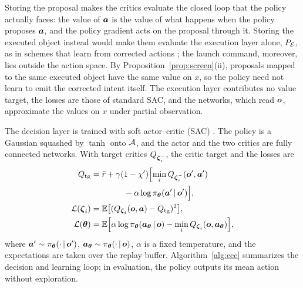 Storing the proposal makes the critics evaluate the closed loop that the policy actually faces: the value of $\boldsymbol{a}$ is the value of what happens when the policy proposes $\boldsymbol{a}$, and the policy gradient acts on the proposal through it. Storing the executed object instead would make them evaluate the execution layer alone, $P_{\mathcal{E}}$, as in schemes that learn from corrected actions \cite{lu2025eaai}; the launch command, moreover, lies outside the action space. By Proposition~\ref{prop:screen}(ii), proposals mapped to the same executed object have the same value on $x$, so the policy need not learn to emit the corrected intent itself. The execution layer contributes no value target, the losses are those of standard SAC, and the networks, which read $\boldsymbol{o}$, approximate the values on $x$ under partial observation.

The decision layer is trained with soft actor--critic (SAC) \cite{haarnoja2018sac}. The policy is a Gaussian squashed by $\tanh$ onto $\mathcal{A}$, and the actor and the two critics are fully connected networks. With target critics $Q_{\boldsymbol{\zeta}_{i}^{-}}$, the critic target and the losses are
\begin{align}
Q_{\mathrm{tg}}&=\tilde{r}+\gamma(1-\chi')\Bigl[\min_{i}Q_{\boldsymbol{\zeta}_{i}^{-}}(\boldsymbol{o}',\boldsymbol{a}')\nonumber\\
&\qquad\qquad-\alpha\log\pi_{\boldsymbol{\theta}}(\boldsymbol{a}'\,|\,\boldsymbol{o}')\Bigr],\label{eq:target}\\
\mathcal{L}(\boldsymbol{\zeta}_{i})&=\mathbb{E}\bigl[(Q_{\boldsymbol{\zeta}_{i}}(\boldsymbol{o},\boldsymbol{a})-Q_{\mathrm{tg}})^{2}\bigr],\label{eq:qloss}\\
\mathcal{L}(\boldsymbol{\theta})&=\mathbb{E}\Bigl[\alpha\log\pi_{\boldsymbol{\theta}}(\boldsymbol{a}_{\boldsymbol{\theta}}\,|\,\boldsymbol{o})-\min_{i}Q_{\boldsymbol{\zeta}_{i}}(\boldsymbol{o},\boldsymbol{a}_{\boldsymbol{\theta}})\Bigr],\label{eq:piloss}
\end{align}
where $\boldsymbol{a}'\sim\pi_{\boldsymbol{\theta}}(\cdot\,|\,\boldsymbol{o}')$, $\boldsymbol{a}_{\boldsymbol{\theta}}\sim\pi_{\boldsymbol{\theta}}(\cdot\,|\,\boldsymbol{o})$, $\alpha$ is a fixed temperature, and the expectations are taken over the replay buffer. Algorithm~\ref{alg:ecc} summarizes the decision and learning loop; in evaluation, the policy outputs its mean action without exploration.

